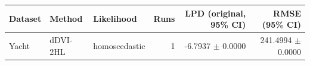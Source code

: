 \begin{tabular}{lllrrr}
\toprule
Dataset & Method & Likelihood & Runs & LPD (original, 95\% CI) & RMSE (95\% CI) \\
\midrule
Yacht & dDVI-2HL & homoscedastic & 1 & -6.7937 $\pm$ 0.0000 & 241.4994 $\pm$ 0.0000 \\
\bottomrule
\end{tabular}
